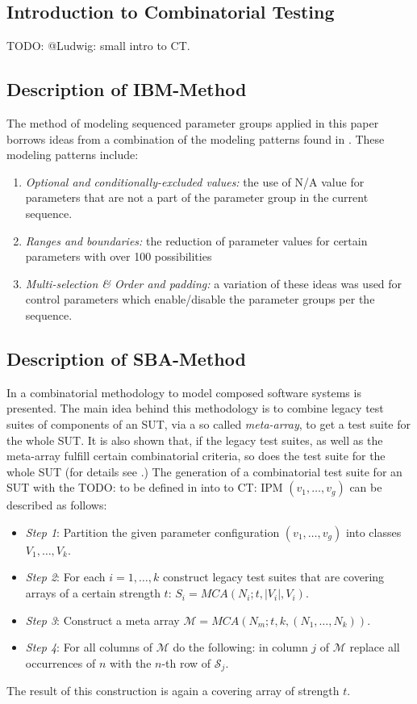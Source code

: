 \documentclass[conference]{IEEEtran}
\newcommand{\todo}[1]{}
\renewcommand{\todo}[1]{{\color{red} TODO: {#1}}}
\begin{document}
					
\subsection{Introduction to Combinatorial Testing}
\todo{@Ludwig: small intro to CT}.

	\subsection{Description of IBM-Method}
	The method of modeling sequenced parameter groups applied in this paper borrows ideas from a combination of the modeling patterns found in \cite{segall2012common}.
	These modeling patterns include: 
	\begin{enumerate}
		\item \textit{Optional and conditionally-excluded values:} the use of N/A value for parameters that are not a part of the parameter group in the current sequence.
		\item \textit{Ranges and boundaries:} the reduction of parameter values for certain parameters with over 100 possibilities
		\item	\textit{Multi-selection \& Order and padding:} a variation of these ideas was used for control parameters which enable/disable the parameter groups per the sequence.
	\end{enumerate}
	

\subsection{Description of SBA-Method}
  In \cite{kampel2017combinatorial} a combinatorial methodology to model composed software systems is presented.
	The main idea behind this methodology is to combine legacy test suites of components of an SUT,
	via a so called \emph{meta-array}, to get a test suite for the whole SUT.
	It is also shown that, if the legacy test suites, as well as the meta-array fulfill certain combinatorial criteria,
	so does the test suite for the whole SUT (for details see \cite{kampel2017combinatorial}.)
	The generation of a combinatorial test suite for an SUT with the \todo{to be defined in into to CT:} IPM $(v_1,\ldots,v_g)$ can be described as follows:
	\begin{itemize}
    \item [] \textit{Step 1}: Partition the given parameter configuration $(v_1,\ldots,v_g)$ into classes $V_1,\ldots,V_k$.
    \item [] \textit{Step 2}: For each $i=1,\ldots,k$ construct legacy test suites that are covering arrays of a certain strength $t$:
		$S_i=\mathit{MCA}(N_i;t,|V_i|,V_i)$.
    \item [] \textit{Step 3}: Construct a meta array $\mathcal M = \mathit{MCA}(N_m;t,k,(N_1,\ldots,N_k))$.
    \item [] \textit{Step 4}: For all columns of $\mathcal M$ do the following:
		in column $j$ of $\mathcal M$ replace all occurrences of $n$ with the $n$-th row of $\mathcal S_j$.
\end{itemize}
The result of this construction is again a covering array of strength $t$.
\end{document}
